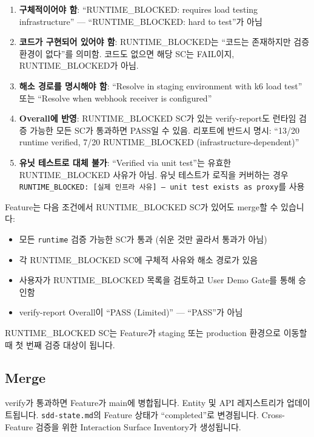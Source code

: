 \documentclass[11pt,a4paper,openright,twoside]{report}
\newcommand{\file}[1]{\texttt{#1}}
\begin{document}
\begin{enumerate}[nosep]
  \item \textbf{구체적이어야 함}: ``RUNTIME\_BLOCKED: requires load testing infrastructure'' --- ``RUNTIME\_BLOCKED: hard to test''가 아님
  \item \textbf{코드가 구현되어 있어야 함}: RUNTIME\_BLOCKED는 ``코드는 존재하지만 검증 환경이 없다''를 의미함. 코드도 없으면 해당 SC는 FAIL이지, RUNTIME\_BLOCKED가 아님.
  \item \textbf{해소 경로를 명시해야 함}: ``Resolve in staging environment with k6 load test'' 또는 ``Resolve when webhook receiver is configured''
  \item \textbf{Overall에 반영}: RUNTIME\_BLOCKED SC가 있는 verify-report도 런타임 검증 가능한 모든 SC가 통과하면 PASS일 수 있음. 리포트에 반드시 명시: ``13/20 runtime verified, 7/20 RUNTIME\_BLOCKED (infrastructure-dependent)''
  \item \textbf{유닛 테스트로 대체 불가}: ``Verified via unit test''는 유효한 RUNTIME\_BLOCKED 사유가 아님. 유닛 테스트가 로직을 커버하는 경우 \texttt{RUNTIME\_BLOCKED: [실제 인프라 사유] --- unit test exists as proxy}를 사용
\end{enumerate}

\begin{tipbox}
Feature는 다음 조건에서 RUNTIME\_BLOCKED SC가 있어도 merge할 수 있습니다:
\begin{itemize}[nosep]
  \item 모든 \texttt{runtime} 검증 가능한 SC가 통과 (쉬운 것만 골라서 통과가 아님)
  \item 각 RUNTIME\_BLOCKED SC에 구체적 사유와 해소 경로가 있음
  \item 사용자가 RUNTIME\_BLOCKED 목록을 검토하고 User Demo Gate를 통해 승인함
  \item verify-report Overall이 ``PASS (Limited)'' --- ``PASS''가 아님
\end{itemize}
RUNTIME\_BLOCKED SC는 Feature가 staging 또는 production 환경으로 이동할 때 첫 번째 검증 대상이 됩니다.
\end{tipbox}

\subsection{Merge}

verify가 통과하면 Feature가 main에 병합됩니다. Entity 및 API 레지스트리가 업데이트됩니다. \file{sdd-state.md}의 Feature 상태가 ``completed''로 변경됩니다. Cross-Feature 검증을 위한 Interaction Surface Inventory가 생성됩니다.
\end{document}

